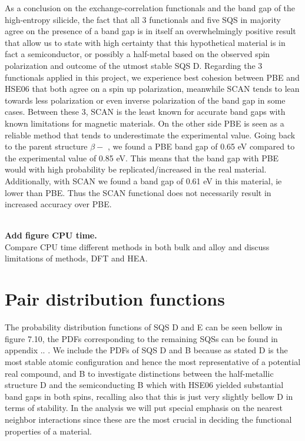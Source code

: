 As a conclusion on the exchange-correlation functionals and the band gap of the  high-entropy silicide, the fact that all 3 functionals and five SQS in majority agree on the presence of a band gap is in itself an overwhelmingly positive result that allow us to state with high certainty that this hypothetical material is in fact a semiconductor, or possibly a half-metal based on the observed spin polarization and outcome of the utmost stable SQS D. Regarding the 3 functionals applied in this project, we experience best cohesion between PBE and HSE06 that both agree on a spin up polarization, meanwhile SCAN tends to lean towards less polarization or even inverse polarization of the band gap in some cases. Between these 3, SCAN is the least known for accurate band gaps with known limitations for magnetic materials. On the other side PBE is seen as a reliable method that tends to underestimate the experimental value. Going back to the parent structure $\beta-$ , we found a PBE band gap of 0.65 eV compared to the experimental value of 0.85 eV.  This means that the band gap with PBE would with high probability be replicated/increased in the real material. Additionally, with SCAN we found a band gap of 0.61 eV in this material, ie lower than PBE. Thus the SCAN functional does not necessarily result in increased accuracy over PBE.
 
\textbf{ \\ Add figure CPU time. \\ }
Compare CPU time different methods in both bulk and alloy and discuss limitations of methods, DFT and HEA. 

\newpage
\section{Pair distribution functions}
The probability distribution functions of SQS D and E can be seen bellow in figure 7.10, the PDFs corresponding to the remaining SQSs can be found in appendix .. . We include the PDFs of SQS D and B because as stated D is the most stable atomic configuration and hence the most representative of a potential real compound, and B to investigate distinctions between the half-metallic structure D and the semiconducting B which with HSE06 yielded substantial band gaps in both spins, recalling also that this is just very slightly bellow D in terms of stability. In the analysis we will put special emphasis on the nearest neighbor interactions since these are the most crucial in deciding the functional properties of a material. 
 
